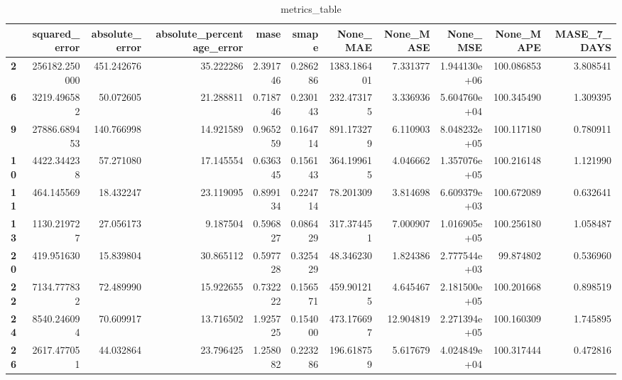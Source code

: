 \begin{table}[h]
\centering
\caption{metrics_table}
\label{table:Experiment with CNN AE and LSTM hybrid method. Global, univariate, dataset 1. Tuned with LSTM Global Univariate dataset 1}
\begin{tabular}{lrrrrrrrrrr}
\toprule
{} &  squared\_error &  absolute\_error &  absolute\_percentage\_error &      mase &     smape &     None\_MAE &  None\_MASE &      None\_MSE &   None\_MAPE &  MASE\_7\_DAYS \\
\midrule
\textbf{2 } &  256182.250000 &      451.242676 &                  35.222286 &  2.391746 &  0.286286 &  1383.186401 &   7.331377 &  1.944130e+06 &  100.086853 &     3.808541 \\
\textbf{6 } &    3219.496582 &       50.072605 &                  21.288811 &  0.718746 &  0.230143 &   232.473175 &   3.336936 &  5.604760e+04 &  100.345490 &     1.309395 \\
\textbf{9 } &   27886.689453 &      140.766998 &                  14.921589 &  0.965259 &  0.164714 &   891.173279 &   6.110903 &  8.048232e+05 &  100.117180 &     0.780911 \\
\textbf{10} &    4422.344238 &       57.271080 &                  17.145554 &  0.636345 &  0.156143 &   364.199615 &   4.046662 &  1.357076e+05 &  100.216148 &     1.121990 \\
\textbf{11} &     464.145569 &       18.432247 &                  23.119095 &  0.899134 &  0.224714 &    78.201309 &   3.814698 &  6.609379e+03 &  100.672089 &     0.632641 \\
\textbf{13} &    1130.219727 &       27.056173 &                   9.187504 &  0.596827 &  0.086429 &   317.374451 &   7.000907 &  1.016905e+05 &  100.256180 &     1.058487 \\
\textbf{20} &     419.951630 &       15.839804 &                  30.865112 &  0.597728 &  0.325429 &    48.346230 &   1.824386 &  2.777544e+03 &   99.874802 &     0.536960 \\
\textbf{22} &    7134.777832 &       72.489990 &                  15.922655 &  0.732222 &  0.156571 &   459.901215 &   4.645467 &  2.181500e+05 &  100.201668 &     0.898519 \\
\textbf{24} &    8540.246094 &       70.609917 &                  13.716502 &  1.925725 &  0.154000 &   473.176697 &  12.904819 &  2.271394e+05 &  100.160309 &     1.745895 \\
\textbf{26} &    2617.477051 &       44.032864 &                  23.796425 &  1.258082 &  0.223286 &   196.618759 &   5.617679 &  4.024849e+04 &  100.317444 &     0.472816 \\

\end{tabular}
\end{table}
